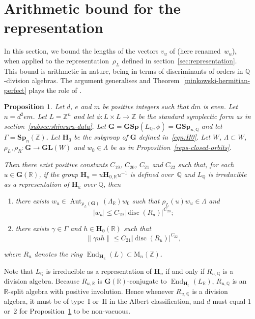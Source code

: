 \documentclass[JEP,XML,SOM,Unicode,NoFloatCountersInSection]{cedram}
\newenvironment{enumeratea}
{\bgroup\def\theenumi{\alph{enumi}}\begin{enumerate}}
{\end{enumerate}\egroup}
\newcommand{\bQ}{\mathbb{Q}}
\newcommand{\bR}{\mathbb{R}}
\newcommand{\bZ}{\mathbb{Z}}
\newcommand{\gG}{\mathbf{G}}
\newcommand{\gGL}{\mathbf{GL}}
\newcommand{\gGSp}{\mathbf{GSp}}
\newcommand{\gH}{\mathbf{H}}
\newcommand{\gSp}{\mathbf{Sp}}
\newcommand{\rM}{\mathrm{M}}
\DeclareMathOperator{\Aut}{Aut}
\DeclareMathOperator{\disc}{disc}
\DeclareMathOperator{\End}{End}
\newcommand{\abs}[1]{\lvert #1 \rvert}
\newcommand{\length}[1]{\lVert #1 \rVert}
\newtheorem{proposition}[lemma]{Proposition}
\begin{document}
\section{Arithmetic bound for the representation} \label{sec:rep-bound}

In this section, we bound the lengths of the vectors $v_u$ of \cite[Th.\,1.2]{QRTUI} (here renamed~$w_u$), when applied to the representation~$\rho_L$ defined in section~\ref{sec:representation}. This bound is arithmetic in nature, being in terms of discriminants of orders in $\bQ$-division algebras. The argument generalises \cite[\S 5.5]{QRTUI} and Theorem~\ref{minkowski-hermitian-perfect} plays the role of \cite[Lem.\,5.7]{QRTUI}.

\begin{proposition} \label{rep-bound-arithmetic}
Let $d$, $e$ and $m$ be positive integers such that $dm$ is even.
Let $n = d^2em$.
Let $L = \bZ^n$ and let $\phi \colon L \times L \to \bZ$ be the standard symplectic form as in section~\ref{subsec:shimura-data}.
Let $\gG = \gGSp(L_\bQ, \phi) = \gGSp_{n,\bQ}$ and let $\Gamma = \gSp_n(\bZ)$.
Let $\gH_0$ be the subgroup of $\gG$ defined in~\eqref{eqn:H0}.
Let $W$, $\Lambda \subset W$, $\rho_L, \rho_R \colon \gG \to \gGL(W)$ and $w_0 \in \Lambda$ be as in Proposition~\ref{reps-closed-orbits}.

Then there exist positive constants $C_{19}$, $C_{20}$, $C_{21}$ and $C_{22}$ such that,
for each $u \in \gG(\bR)$, if the group $\gH_u = u \gH_{0,\bR} u^{-1}$ is defined over~$\bQ$ and $L_\bQ$ is irreducible as a representation of $\gH_u$ over $\bQ$, then
\begin{enumeratea}
\item\label{rep-bound-arithmetica} there exists $w_u \in \Aut_{\rho_L(\gG)}(\Lambda_\bR) w_0$ such that $\rho_L(u) w_u \in \Lambda$ and
\[
\abs{w_u} \leq C_{19} \abs{\disc(R_u)}^{C_{20}};
\]
\item\label{rep-bound-arithmeticb} there exists $\gamma \in \Gamma$ and $h \in \gH_0(\bR)$ such that
\[
\length{\gamma uh} \leq C_{21} \abs{\disc(R_u)}^{C_{22}},
\]
\end{enumeratea}
where $R_u$ denotes the ring $\End_{\gH_u}(L) \subset \rM_n(\bZ)$.
\end{proposition}

Note that $L_\bQ$ is irreducible as a representation of $\gH_u$ if and only if $R_{u,\bQ}$ is a division algebra.
Because $R_{u,\bR}$ is $\gG(\bR)$-conjugate to $\End_{\gH_0}(L_\bR)$, $R_{u,\bQ}$ is an $\bR$-split algebra with positive involution. Hence whenever $R_{u,\bQ}$ is a division algebra, it must be of type~I or~II in the Albert classification, and $d$ must equal $1$ or~$2$ for Proposition~\ref{rep-bound-arithmetic} to be non-vacuous.
\end{document}
